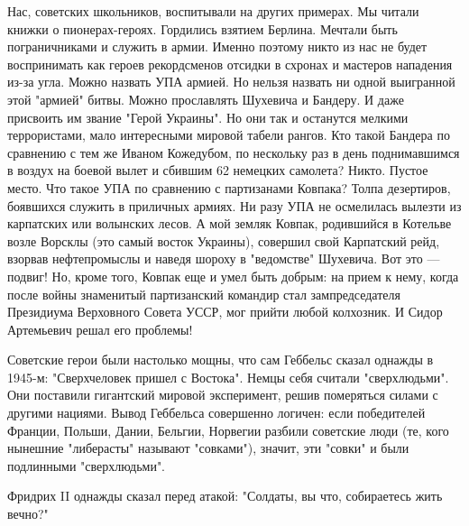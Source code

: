 Нас, советских школьников, воспитывали на других примерах. Мы читали книжки о
пионерах-героях. Гордились взятием Берлина. Мечтали быть пограничниками и
служить в армии. Именно поэтому никто из нас не будет воспринимать как героев
рекордсменов отсидки в схронах и мастеров нападения из-за угла. Можно назвать
УПА армией. Но нельзя назвать ни одной выигранной этой "армией" битвы. Можно
прославлять Шухевича и Бандеру. И даже присвоить им звание "Герой Украины". Но
они так и останутся мелкими террористами, мало интересными мировой табели
рангов. Кто такой Бандера по сравнению с тем же Иваном Кожедубом, по нескольку
раз в день поднимавшимся в воздух на боевой вылет и сбившим 62 немецких
самолета? Никто. Пустое место. Что такое УПА по сравнению с партизанами
Ковпака? Толпа дезертиров, боявшихся служить в приличных армиях. Ни разу УПА не
осмелилась вылезти из карпатских или волынских лесов. А мой земляк Ковпак,
родившийся в Котельве возле Ворсклы (это самый восток Украины), совершил свой
Карпатский рейд, взорвав нефтепромыслы и наведя шороху в "ведомстве" Шухевича.
Вот это --- подвиг! Но, кроме того, Ковпак еще и умел быть добрым: на прием к
нему, когда после войны знаменитый партизанский командир стал зампредседателя
Президиума Верховного Совета УССР, мог прийти любой колхозник. И Сидор
Артемьевич решал его проблемы!

Советские герои были настолько мощны, что сам Геббельс сказал однажды в 1945-м:
"Сверхчеловек пришел с Востока". Немцы себя считали "сверхлюдьми". Они
поставили гигантский мировой эксперимент, решив померяться силами с другими
нациями. Вывод Геббельса совершенно логичен: если победителей Франции, Польши,
Дании, Бельгии, Норвегии разбили советские люди (те, кого нынешние "либерасты"
называют "совками"), значит, эти "совки" и были подлинными "сверхлюдьми".

Фридрих II однажды сказал перед атакой: "Солдаты, вы что, собираетесь жить
вечно?"

